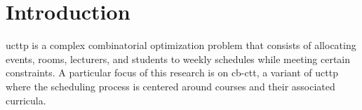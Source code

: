 
\chapter{Introduction}


\label{Introduction}


\ac{ucttp} is a complex combinatorial optimization problem that consists of allocating events, rooms, lecturers, and students to weekly schedules while meeting certain constraints. A particular focus of this research is on \ac{cb-ctt}, a variant of \ac{ucttp} where the scheduling process is centered around courses and their associated curricula. 


